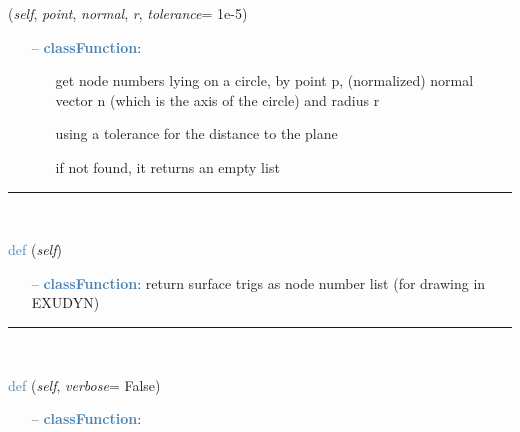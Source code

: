 \begin{itemize}[leftmargin=1.4cm]
\begin{itemize}[leftmargin=0.5cm]
\begin{itemize}[leftmargin=1.4cm]
\begin{itemize}[leftmargin=0.5cm]
\begin{flushleft}
({\it self}, {\it point}, {\it normal}, {\it r}, {\it tolerance}= 1e-5)
\end{flushleft}
\setlength{\itemindent}{0.7cm}
\begin{itemize}[leftmargin=0.7cm]
  \item[--]  \textcolor{steelblue}{\bf classFunction}: \vspace{-6pt}
  \begin{itemize}[leftmargin=1.2cm]
\setlength{\itemindent}{-0.7cm}
    \item[] get node numbers lying on a circle, by point p, (normalized) normal vector n (which is the axis of the circle) and radius r
    \item[] using a tolerance for the distance to the plane
    \item[] if not found, it returns an empty list
  \end{itemize}
\vspace{12pt}\end{itemize}
%
\noindent\rule{8cm}{0.75pt}\vspace{1pt} \\ 
\begin{flushleft}
\noindent \textcolor{steelblue}{def {\bf {}}}\label{sec:FEM:FEMinterface:GetSurfaceTriangles}
({\it self})
\end{flushleft}
\setlength{\itemindent}{0.7cm}
\begin{itemize}[leftmargin=0.7cm]
  \item[--]  \textcolor{steelblue}{\bf classFunction}: return surface trigs as node number list (for drawing in EXUDYN)\vspace{12pt}\end{itemize}
%
\noindent\rule{8cm}{0.75pt}\vspace{1pt} \\ 
\begin{flushleft}
\noindent \textcolor{steelblue}{def {\bf {}}}\label{sec:FEM:FEMinterface:VolumeToSurfaceElements}
({\it self}, {\it verbose}= False)
\end{flushleft}
\setlength{\itemindent}{0.7cm}
\begin{itemize}[leftmargin=0.7cm]
  \item[--]  \textcolor{steelblue}{\bf classFunction}: \vspace{-6pt}
  \begin{itemize}[leftmargin=1.2cm]

\end{itemize}
\end{itemize}
\end{itemize}
\end{itemize}
\end{itemize}
\end{itemize}
